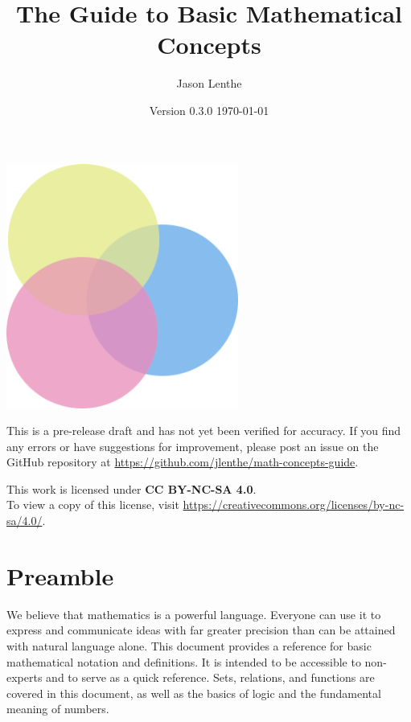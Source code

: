 \documentclass[letterpaper]{article}
\title{\sffamily\textbf{The Guide to Basic Mathematical Concepts}}
\author{\sffamily Jason Lenthe}
\date{Version 0.3.0 \quad \today}
\begin{document}
\maketitle
\vskip 0.5in
\begin{center}
    \includegraphics[width=3in]{images/logo.png}
\end{center}

\vfill
\begin{warning}
  This is a pre-release draft and has not yet been verified for accuracy.
  If you find any errors or have suggestions for improvement, please post
  an issue on the GitHub repository at
  \url{https://github.com/jlenthe/math-concepts-guide}.
\end{warning}
\begin{center}
    {\small This work is licensed under \textbf{CC BY-NC-SA 4.0}.\\
    To view a copy of this license, visit \url{https://creativecommons.org/licenses/by-nc-sa/4.0/}.}
\end{center}

\newpage
\tableofcontents
\newpage

\section*{Preamble}
We believe that mathematics is a powerful language. Everyone can use it to
express and communicate ideas with far greater precision than can be attained
with natural language alone. This document provides a reference for basic
mathematical notation and definitions. It is intended to be accessible to
non-experts and to serve as a quick reference. Sets, relations, and functions
are covered in this document, as well as the basics of logic and the
fundamental meaning of numbers.
\end{document}
